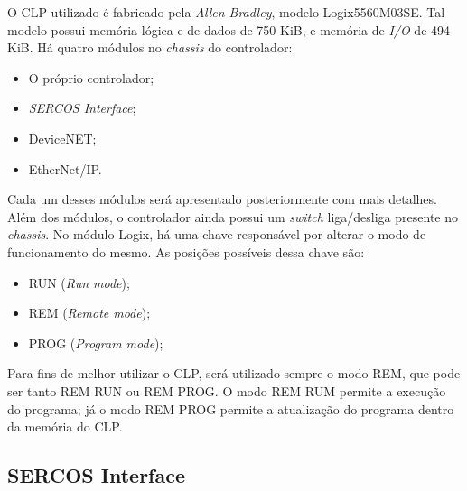O CLP utilizado é fabricado pela \textit{Allen Bradley}, modelo Logix5560M03SE. Tal modelo possui memória lógica e de dados de 750 KiB, e memória de \textit{I/O} de 494 KiB. Há quatro módulos no \textit{chassis} do controlador:
\begin{itemize}
  \item O próprio controlador;
  \item \textit{SERCOS Interface};
  \item DeviceNET;
  \item EtherNet/IP.
\end{itemize}

Cada um desses módulos será apresentado posteriormente com mais detalhes. Além dos módulos, o controlador ainda possui um \textit{switch} liga/desliga presente no \textit{chassis}. No módulo Logix, há uma chave responsável por alterar o modo de funcionamento do mesmo. As posições possíveis dessa chave são:
\begin{itemize}
  \item RUN (\textit{Run mode});
  \item REM (\textit{Remote mode});
  \item PROG (\textit{Program mode});
\end{itemize}

Para fins de melhor utilizar o CLP, será utilizado sempre o modo REM, que pode ser tanto REM RUN ou REM PROG. O modo REM RUM permite a execução do programa; já o modo REM PROG permite a atualização do programa dentro da memória do CLP.
\subsection{SERCOS Interface}

